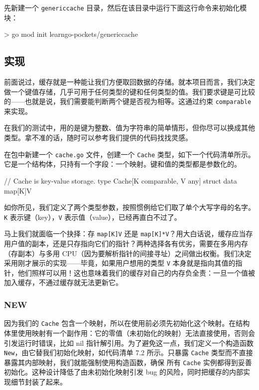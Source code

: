 先新建一个 \texttt{genericcache} 目录，然后在该目录中运行下面这行命令来初始化模块：

\begin{shellcode}[]
> go mod init learngo-pockets/genericcache
\end{shellcode}

\subsection{实现}

前面说过，缓存就是一种能让我们方便取回数据的存储。就本项目而言，我们决定做一个键值存储，几乎可用于任何类型的键和任何类型的值。我们要求键是可比较的——也就是说，我们需要能判断两个键是否视为相等。这通过约束 \texttt{comparable} 来实现。

在我们的测试中，用的是键为整数、值为字符串的简单情形，但你尽可以换成其他类型。拿不准的话，随时可以参考我们提供的代码找找灵感。

在包中新建一个 \texttt{cache.go} 文件，创建一个 \texttt{Cache} 类型，如下一个代码清单所示。它是一个结构体，只持有一个字段：一个映射。键和值的类型都是参数化的。

\begin{gocode}[title={代码清单 7.1 \texttt{cache.go}}]
// Cache is key-value storage.
type Cache[K comparable, V any] struct {
    data  map[K]V
}
\end{gocode}

如你所见，我们定义了两个类型参数，按照惯例给它们取了单个大写字母的名字。\texttt{K} 表示键（key），\texttt{V} 表示值（value），已经再直白不过了。

马上我们就面临一个抉择：存 \texttt{map[K]V} 还是 \texttt{map[K]*V}？用大白话说，缓存应当存用户值的副本，还是只存指向它们的指针？两种选择各有优劣，需要在多用内存（存副本）与多用 CPU（因为要解析指针的间接寻址）之间做出权衡。我们决定采用刚才展示的实现——毕竟，如果用户想用的类型 \texttt{V} 本身就是指向其值的指针，他们照样可以用！这也意味着我们的缓存对自己的内存负全责：一旦一个值被加入缓存，不通过缓存就无法更新它。

\subsubsection*{NEW}

因为我们的 \texttt{Cache} 包含一个映射，所以在使用前必须先初始化这个映射。在结构体里使用映射有一个副作用：它的零值（未初始化的映射）无法直接使用，否则会引发运行时错误，比如 nil 指针解引用。为了避免这一点，我们定义一个构造函数 \texttt{New}，由它替我们初始化映射，如代码清单 7.2 所示。只暴露 \texttt{Cache} 类型而不直接暴露其内部映射，我们就能强制使用构造函数，确保
所有 \texttt{Cache} 实例都得到妥善初始化。这种设计降低了由未初始化映射引发 bug 的风险，同时把缓存的内部实现细节封装了起来。

